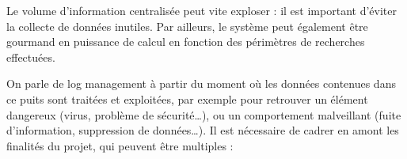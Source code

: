 Le volume d’information centralisée peut vite exploser : il est important d’éviter la collecte de données inutiles. Par ailleurs, le système peut également être gourmand en puissance de calcul en fonction des périmètres de recherches effectuées.

On parle de log management à partir du moment où les données contenues dans ce puits sont traitées et exploitées, par exemple pour retrouver un élément dangereux (virus, problème de sécurité…), ou un comportement malveillant (fuite d’information, suppression de données…). Il est nécessaire de cadrer en amont les finalités du projet,  qui peuvent être multiples :
